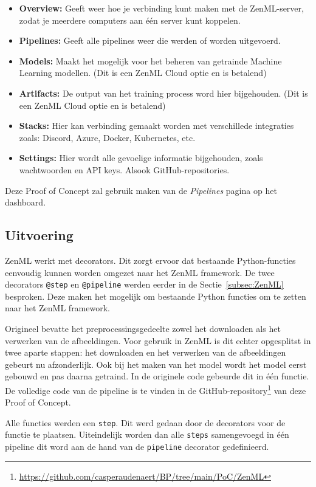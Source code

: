 \begin{itemize}
    \item \textbf{Overview:} Geeft weer hoe je verbinding kunt maken met de ZenML-server, zodat je meerdere computers aan één server kunt koppelen.
    \item \textbf{Pipelines:} Geeft alle pipelines weer die werden of worden uitgevoerd.
    \item \textbf{Models:} Maakt het mogelijk voor het beheren van getrainde Machine Learning modellen. (Dit is een ZenML Cloud optie en is betalend)
    \item \textbf{Artifacts:} De output van het training process word hier bijgehouden. (Dit is een ZenML Cloud optie en is betalend)
    \item \textbf{Stacks:} Hier kan verbinding gemaakt worden met verschillede integraties zoals: Discord, Azure, Docker, Kubernetes, etc.
    \item \textbf{Settings:} Hier wordt alle gevoelige informatie bijgehouden, zoals wachtwoorden en API keys. Alsook GitHub-repositories.
\end{itemize}
Deze Proof of Concept zal gebruik maken van de \textit{Pipelines} pagina op het dashboard.

\subsection{Uitvoering}
ZenML werkt met decorators. Dit zorgt ervoor dat bestaande Python-functies eenvoudig kunnen worden omgezet naar het ZenML framework. De twee decorators \texttt{@step} en \texttt{@pipeline} werden eerder in de Sectie~\ref{subsec:ZenML} besproken. Deze maken het mogelijk om bestaande Python functies om te zetten naar het ZenML framework.

Origineel bevatte het preprocessingsgedeelte zowel het downloaden als het verwerken van de afbeeldingen. Voor gebruik in ZenML is dit echter opgesplitst in twee aparte stappen: het downloaden en het verwerken van de afbeeldingen gebeurt nu afzonderlijk. Ook bij het maken van het model wordt het model eerst gebouwd en pas daarna getraind. In de originele code gebeurde dit in één functie.
De volledige code van de pipeline is te vinden in de GitHub-repository\footnote{\url{https://github.com/casperaudenaert/BP/tree/main/PoC/ZenML}} van deze Proof of Concept.

Alle functies werden een \texttt{step}. Dit werd gedaan door de decorators voor de functie te plaatsen. Uiteindelijk worden dan alle \texttt{steps} samengevoegd in één pipeline dit word aan de hand van de \texttt{pipeline} decorator gedefinieerd.
